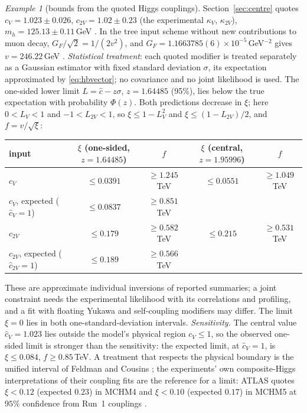 \documentclass[aps,pra,onecolumn,superscriptaddress,nofootinbib,10pt]{revtex4-2}
\theoremstyle{definition}
\theoremstyle{remark}
\newtheorem{example}[theorem]{Example}
\begin{document}
\begin{example}[bounds from the quoted Higgs couplings]\label{ex:hbdata}
Section~\ref{sec:centre} quotes $c_V=1.023\pm0.026$, $c_{2V}=1.02\pm0.23$ (the experimental $\kappa_V$, $\kappa_{2V}$), $m_h=125.13\pm0.11$\,GeV \cite{ex-PDG26}.  In the tree input
scheme without new contributions to muon decay, $G_F/\sqrt2=1/(2v^2)$, and $G_F=1.1663785(6)\times10^{-5}$\,GeV$^{-2}$ gives
$v=246.22$\,GeV \cite[Sec.~10.3.2 of the electroweak review]{ex-PDG26}.  \emph{Statistical treatment}: each quoted
modifier is treated separately as a Gaussian estimator with fixed standard deviation $\sigma$, its expectation
approximated by \eqref{eq:hbvector}; no covariance and no joint likelihood is used.  The one-sided lower limit
$L=\hat c-z\sigma$, $z=1.64485$ (95\%), lies below the true expectation with probability $\Phi(z)$.  Both predictions
decrease in $\xi$; here $0<L_V<1$ and $-1<L_{2V}<1$, so $\xi\le1-L_V^2$ and $\xi\le(1-L_{2V})/2$, and $f=v/\sqrt\xi$:
\begin{center}\footnotesize
\begin{tabular}{@{}lcccc@{}}
\toprule
input & $\xi$ (one-sided, $z=1.64485$) & $f$ & $\xi$ (central, $z=1.95996$) & $f$\\
\midrule
$c_V$ & $\le0.0391$ & $\ge1.245$\,TeV & $\le0.0551$ & $\ge1.049$\,TeV\\
$c_V$, expected ($\hat c_V=1$) & $\le0.0837$ & $\ge0.851$\,TeV & & \\
$c_{2V}$ & $\le0.179$ & $\ge0.582$\,TeV & $\le0.215$ & $\ge0.531$\,TeV\\
$c_{2V}$, expected ($\hat c_{2V}=1$) & $\le0.189$ & $\ge0.566$\,TeV & & \\
\bottomrule
\end{tabular}
\end{center}
These are approximate individual inversions of reported summaries; a joint constraint needs the
experimental likelihood with its correlations and profiling, and a fit with floating Yukawa and
self-coupling modifiers may differ.  The limit $\xi=0$ lies in both one-standard-deviation intervals.
\emph{Sensitivity.}  The central value $\hat c_V=1.023$ lies outside the model's physical region $c_V\le1$, so
the observed one-sided limit is stronger than the sensitivity: the expected limit, at $\hat c_V=1$, is
$\xi\le0.084$, $f\ge0.85$\,TeV.  A treatment that respects the physical boundary is the unified interval of
Feldman and Cousins \cite{rf:FeldmanCousins1998}; the experiments' own composite-Higgs interpretations of their
coupling fits are the reference for a limit: ATLAS quotes $\xi<0.12$ (expected $0.23$) in MCHM4 and $\xi<0.10$
(expected $0.17$) in MCHM5 at $95\%$ confidence from Run~1 couplings \cite{rf:ATLAS2015}.
\end{example}
\end{document}
